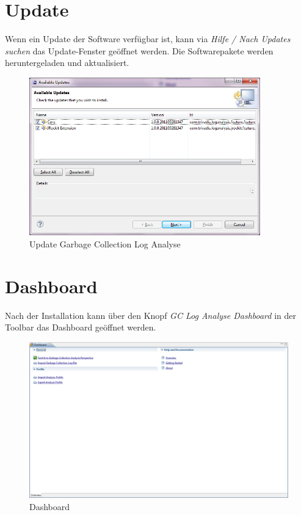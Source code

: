 \section{Update}
Wenn ein Update der Software verfügbar ist, kann via \textit{Hilfe / Nach Updates suchen} das Update-Fenster geöffnet werden. Die  Softwarepakete werden heruntergeladen und aktualisiert.
 \begin{figure}[H]
  	\centering
    	\includegraphics[width=10cm]{images/tutorial_update01}
        	\caption{Update Garbage Collection Log Analyse}
\end{figure}

\section{Dashboard}
Nach der Installation kann über den Knopf \textit{GC Log Analyse Dashboard} in der Toolbar das Dashboard geöffnet werden. 
 \begin{figure}[H]
  	\centering
    	\includegraphics[width=16cm]{images/tutorial_dashboard}
        	\caption{Dashboard}
\end{figure}

